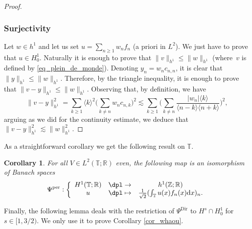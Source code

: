 \documentclass[JEP,XML,SOM,Unicode,NoEqCountersInSection,published]{cedram}
\newcommand\mto{\mathchoice{\longmapsto}{\mapsto}{\mapsto}{\mapsto}}
\newtheorem{corollary}[theorem]{Corollary}
\theoremstyle{definition}
\begin{document}
\begin{proof}
\subsubsection*{Surjectivity}
Let $w\in h^1$ and let us set $u = \sum_{n\geq 1} w_n f_n$ (a priori in $L^2$). We just have to prove that $u \in H^1_0$. Naturally it is enough to prove that $\|v\|_{h^1} \leq \|w\|_{h^1}$ (where~$v$ is defined by \eqref{eq_plein_de_monde}). Denoting $y_n = w_n c_{n,n}$, it is clear that $\| y\|_{h^1} \leq \|w\|_{h^1}$. Therefore, by the triangle inequality, it is enough to prove that $\|v-y\|_{h^1} \leq \|w\|_{h^1}$. Observing that, by definition, we have
\[
\|v-y\|_{h^1}^2 = \sum_{k \geq 1} \langle k\rangle^2 \biggl(\sum_{k\neq n} w_n c_{n,k} \biggr)^2 \lesssim \sum_{k \geq 1} \biggl(\sum_{k\neq n} \frac{|w_n| \langle k \rangle}{\langle n-k \rangle \langle n+k \rangle } \biggr)^2,
\]
arguing as we did for the continuity estimate, we deduce that $\|v-y\|_{h^1}^2\lesssim \| w \|_{h^1}^2$.
\end{proof}
As a straightforward corollary we get the following result on $\mathbb{T}$.
\begin{corollary}
\label{cor_id_per}
For all $V\in L^2(\mathbb{T};\mathbb{R})$ even, the following map is an isomorphism of Banach spaces
\[
\Psi^{\mathrm{per}}:\left\{ \begin{array}{ccc} H^1(\mathbb{T};\mathbb{R}) & \dpl\to & h^1(\mathbb{Z};\mathbb{R}) \\
u & \dpl\mto & \frac1{\sqrt2} (\int_\mathbb{T} u(x) f_n(x) \mathrm{d}x)_n.
\end{array} \right.
\]
\end{corollary}

Finally, the following lemma deals with the restriction of $\Psi^{\mathrm{Dir}}$ to $H^{s}\cap H^1_0$ for $s\in[1,3/2)$. We only use it to prove Corollary \ref{cor_whaou}.
\end{document}
